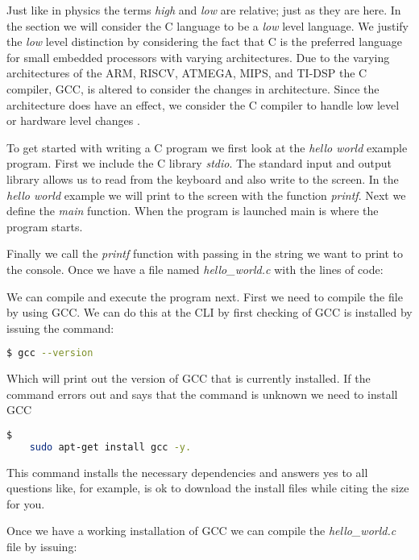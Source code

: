 Just like in physics the terms \emph{high} and \emph{low} are relative; just as they are here. In the section we will consider the C language to be a \emph{low} level language. We justify the \emph{low} level distinction by considering the fact that C is the preferred language for small embedded processors with varying architectures. Due to the varying architectures of the \ac{ARM}, \ac{RISCV}, \ac{ATMEGA}, \ac{MIPS}, and \ac{TI-DSP} the C compiler, \ac{GCC}, is altered to consider the changes in architecture. Since the architecture does have an effect, we consider the C compiler to handle low level or hardware level changes \cite{cstd}. 

To get started with writing a C program we first look at the \emph{hello world} example program. First we include the C library \emph{stdio}. The standard input and output library allows us to read from the keyboard and also write to the screen. In the \emph{hello world} example we will print to the screen with the function \emph{printf}. Next we define the \emph{main} function. When the program is launched main is where the program starts.

Finally we call the \emph{printf} function with passing in the string we want to print to the console. Once we have a file named \emph{hello\_world.c} with the lines of code:



We can compile and execute the program next. First we need to compile the file by using \ac{GCC}. We can do this at the \ac{CLI} by first checking of \ac{GCC} is installed by issuing the command: 
	
\begin{lstlisting}[language=bash]    
	$ gcc --version
\end{lstlisting}
	
Which will print out the version of \ac{GCC} that is currently installed. If the command errors out and says that the command is unknown we need to install \ac{GCC}	
	
\begin{lstlisting}[language=bash]$
	sudo apt-get install gcc -y.
\end{lstlisting}

This command installs the necessary dependencies and answers yes to all questions like, for example, is ok to download the install files while citing the size for you.

Once we have a working installation of \ac{GCC} we can compile the \emph{hello\_world.c} file by issuing:

